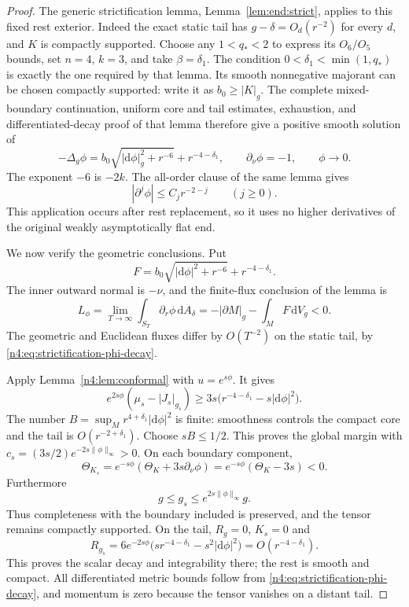\begin{proof}
The generic strictification lemma, Lemma~\ref{lem:end:strict}, applies
to this fixed rest exterior. Indeed the exact static tail has
$g-\delta=O_d(r^{-2})$ for every $d$, and $K$ is compactly supported.
Choose any $1<q_*<2$ to express its $O_6/O_5$ bounds, set $n=4$,
$k=3$, and take $\beta=\delta_1$. The condition
$0<\delta_1<\min(1,q_*)$ is exactly the one required by that lemma.
Its smooth nonnegative majorant can be chosen compactly supported:
write it as $b_0\ge|K|_g$. The complete mixed-boundary continuation,
uniform core and tail estimates, exhaustion, and differentiated-decay
proof of that lemma therefore give a positive smooth solution of
\begin{equation}\label{n4:eq:strictification-pde}
 -\Delta_g\phi=b_0\sqrt{|\mathrm d\phi|_g^2+r^{-6}}+r^{-4-\delta_1},
 \qquad \partial_\nu\phi=-1,\qquad \phi\longrightarrow0.
\end{equation}
The exponent $-6$ is $-2k$. The all-order clause of the same lemma
gives
\begin{equation}\label{n4:eq:strictification-phi-decay}
 |\partial^j\phi|\le C_jr^{-2-j}\qquad(j\ge0).
\end{equation}
This application occurs after rest replacement, so it uses no higher
derivatives of the original weakly asymptotically flat end.

We now verify the geometric conclusions. Put
\[F=b_0\sqrt{|\mathrm d\phi|^2+r^{-6}}+r^{-4-\delta_1}.\]
The inner outward normal is $-\nu$, and the finite-flux conclusion of the lemma is
\begin{equation}\label{n4:eq:strictification-flux}
 L_\phi=\lim_{T\to\infty}\int_{S_T}\partial_r\phi\,\mathrm dA_\delta
       =-|\partial M|_g-\int_MF\,\mathrm dV_g<0.
\end{equation}
The geometric and Euclidean fluxes differ by $O(T^{-2})$ on the static
tail, by \eqref{n4:eq:strictification-phi-decay}.

Apply Lemma~\ref{n4:lem:conformal} with $u=e^{s\phi}$. It gives
\[
 e^{2s\phi}(\mu_s-|J_s|_{g_s})
 \ge3s\bigl(r^{-4-\delta_1}-s|\mathrm d\phi|^2\bigr).
\]
The number $B=\sup_M r^{4+\delta_1}|\mathrm d\phi|^2$ is finite:
smoothness controls the compact core and the tail is $O(r^{-2+\delta_1})$.
Choose $sB\le1/2$. This proves the global margin with
$c_s=(3s/2)e^{-2s\|\phi\|_\infty}>0$. On each boundary component,
\[
 \Theta_{K_s}=e^{-s\phi}(\Theta_K+3s\partial_\nu\phi)
            =e^{-s\phi}(\Theta_K-3s)<0.
\]
Furthermore
\begin{equation}\label{n4:eq:strictification-metric-comparison}
 g\le g_s\le e^{2s\|\phi\|_\infty}g.
\end{equation}
Thus completeness with the boundary included is preserved, and the
tensor remains compactly supported. On the tail, $R_g=0$, $K_s=0$ and
\[
 R_{g_s}=6e^{-2s\phi}
       \bigl(sr^{-4-\delta_1}-s^2|\mathrm d\phi|^2\bigr)
       =O(r^{-4-\delta_1}).
\]
This proves the scalar decay and integrability there; the rest is smooth
and compact. All differentiated metric bounds follow from
\eqref{n4:eq:strictification-phi-decay}, and momentum is zero because
the tensor vanishes on a distant tail.


\end{proof}
